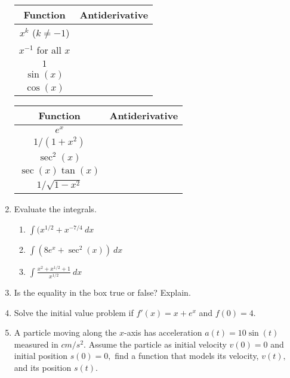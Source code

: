 \documentclass[11pt,fleqn]{article}
\def\ds{\displaystyle}
\begin{document}
\begin{enumerate}
\doublespacing
\begin{tabular}{|c|c|}\hline
Function & \quad \quad Antiderivative \quad \quad \quad \\ \hline
$\ds x^k$ ($k\neq -1$) &\\  \hline
$\ds x^{-1}$ for all $x$&\\ \hline
$\ds 1$ &\\ \hline
$\ds \sin(x)$ & \\ \hline
$\ds \cos(x)$ &\\ \hline
\end{tabular}
\quad
\begin{tabular}{|c|c|}\hline
Function & \quad \quad Antiderivative \quad \quad \quad \\ \hline
$\ds e^x$ &\\ \hline
$\ds 1/(1+x^2)$  &\\ \hline
$\ds \sec^2(x)$ &\\ \hline
$\ds \sec(x)\tan(x)$ &\\ \hline
$\ds 1/\sqrt{1-x^2}$ &\\ \hline
\end{tabular}
\singlespacing
\newpage
\item Evaluate the integrals.
	\begin{enumerate}
	\item $\displaystyle{\int( x^{1/2} + x^{-7/4}\: dx}$\\

	\item $\displaystyle{\int( 8e^{x} + \sec^2(x))\: dx}$\\
	\item $\displaystyle{\int \frac{x^2+x^{1/2}+1}{x^{1/2}}\: dx}$
	\vspace{.5in}
	\end{enumerate}
\item Is the equality in the box true or false? Explain. \hfill {}\\
\vspace{.5in}
\item Solve the initial value problem if $f'(x)=x+e^x$ and $f(0)=4.$
\vfill
\item A particle moving along the $x$-axis has acceleration $a(t)=10\sin(t)$ measured in $cm/s^2.$ Assume the particle as initial velocity $v(0)=0$ and initial position $s(0)=0,$ find a function that models its velocity, $v(t),$ and its position $s(t).$
\vfill
\end{enumerate}
\end{document}

